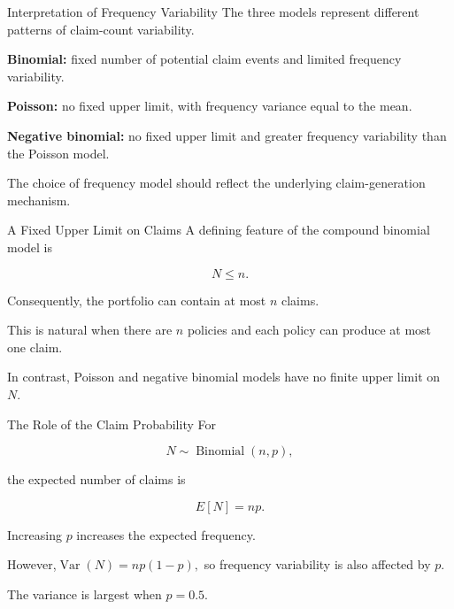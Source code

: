 \documentclass[
  ignorenonframetext,
  aspectratio=169,
]{beamer}
\begin{document}
\begin{frame}{Interpretation of Frequency Variability}
\protect{}\label{interpretation-of-frequency-variability}
The three models represent different patterns of claim-count
variability.

\textbf{Binomial:} fixed number of potential claim events and limited
frequency variability.

\textbf{Poisson:} no fixed upper limit, with frequency variance equal to
the mean.

\textbf{Negative binomial:} no fixed upper limit and greater frequency
variability than the Poisson model.

The choice of frequency model should reflect the underlying
claim-generation mechanism.
\end{frame}

\begin{frame}{A Fixed Upper Limit on Claims}
\protect{}\label{a-fixed-upper-limit-on-claims}
A defining feature of the compound binomial model is

\[
N\leq n.
\]

Consequently, the portfolio can contain at most \(n\) claims.

This is natural when there are \(n\) policies and each policy can
produce at most one claim.

In contrast, Poisson and negative binomial models have no finite upper
limit on \(N\).
\end{frame}

\begin{frame}{The Role of the Claim Probability}
\protect{}\label{the-role-of-the-claim-probability}
For

\[
N\sim\operatorname{Binomial}(n,p),
\]

the expected number of claims is

\[
E[N]=np.
\]

Increasing \(p\) increases the expected frequency.

However,\(\operatorname{Var}(N)=np(1-p),\) so frequency variability is
also affected by \(p\).

The variance is largest when \(p=0.5\).
\end{frame}
\end{document}
